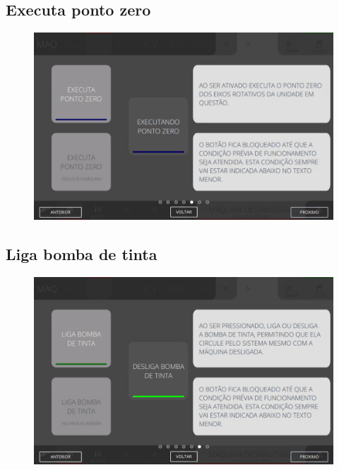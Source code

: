 \newpage
\thispagestyle{fancy}
\vspace*{40 pt}
\subsection{Executa ponto zero}
\vspace*{\fill}
\begin{figure}[h]
    \centering
    \includegraphics[width=576 px,height=360 px]{src/imagesICV/04-printters/02-printter/commands/5.png}
\end{figure}
\vspace*{\fill}

\newpage
\thispagestyle{fancy}
\vspace*{40 pt}
\subsection{Liga bomba de tinta}
\vspace*{\fill}
\begin{figure}[h]
    \centering
    \includegraphics[width=576 px,height=360 px]{src/imagesICV/04-printters/02-printter/commands/6.png}
\end{figure}
\vspace*{\fill}

